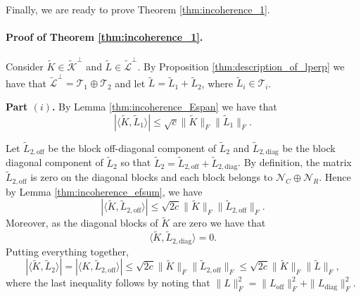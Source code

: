 



Finally, we are ready to prove  Theorem \ref{thm:incoherence_1}.


\paragraph{Proof of Theorem \ref{thm:incoherence_1}.} Consider   $\tilde{K} \in \tilde{\mathcal{K}}^\perp$ and  $\tilde{L} \in \tilde{\mathcal{L}}^\perp$.   By Proposition \ref{thm:description_of_lperp} we have that 
$\tilde{\mathcal{L}}^\perp=\mathcal{T}_1\oplus \mathcal{T}_2$ and let   $\tilde{L} =\tilde{L}_1+\tilde{L}_2$, where $\tilde{L}_i\in \mathcal{T}_i$. 


\medskip 
    \textbf{Part $(i)$.} 
By %
    Lemma \ref{thm:incoherence_Espan} we have that  
$$| \langle \tilde{K}, \tilde{L}_1 \rangle | \leq \sqrt{c}\|\tilde{K}\|_F  \|\tilde{L}_1 \|_F.$$ 

 Let $\tilde{L}_{2,\mathrm{off}}$ be the block off-diagonal component of $\tilde{L}_2$ and $\tilde{L}_{2,\mathrm{diag}}$ be the block diagonal component of $\tilde{L}_2$ so that $\tilde{L}_2 = \tilde{L}_{2,\mathrm{off}} + \tilde{L}_{2,\mathrm{diag}}$.  
By definition, the matrix $\tilde{L}_{2,\mathrm{off}}$ is zero on the diagonal  blocks  and  each block belongs to $\mathcal{N}_{C} \oplus \mathcal{N}_{R}$.  Hence by Lemma \ref{thm:incoherence_efsum}, we have 
$$| \langle \tilde{K}, \tilde{L}_{2,\mathrm{off}} \rangle | \leq \sqrt{2c} \| \tilde{K} \|_F \| \tilde{L}_{2,\mathrm{off}} \|_F.$$
Moreover, as the diagonal blocks of $\tilde{K}$ are zero we  have that 
$$\langle \tilde{K}, \tilde{L}_{2,\mathrm{diag}} \rangle =0.$$
Putting everything together,
$$| \langle \tilde{K}, \tilde{L}_2 \rangle | = | \langle K, \tilde{L}_{2,\mathrm{off}} \rangle | \leq \sqrt{2c}  \| \tilde{K} \|_F \| \tilde{L}_{\mathrm{2,off}} \|_F \leq \sqrt{2c} \| \tilde{K} \|_F \| \tilde{L} \|_F,$$   
where the last inequality follows by noting that $\| L \|_F^2 = \| L_{\mathrm{off}} \|_F^2 + \| L_{\mathrm{diag}} \|_F^2$.

